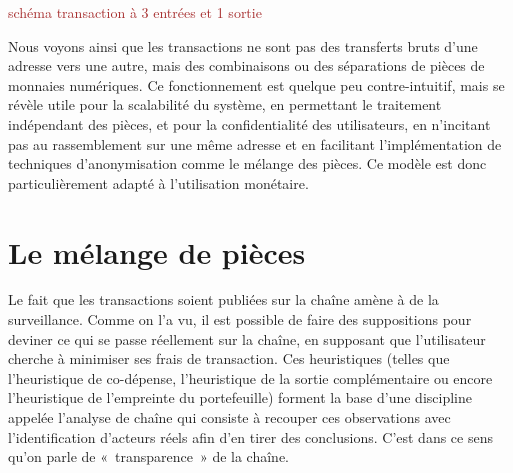 \textcolor{brown}{schéma transaction à 3 entrées et 1 sortie}

Nous voyons ainsi que les transactions ne sont pas des transferts bruts d'une adresse vers une autre, mais des combinaisons ou des séparations de pièces de monnaies numériques. Ce fonctionnement est quelque peu contre-intuitif, mais se révèle utile pour la scalabilité du système, en permettant le traitement indépendant des pièces, et pour la confidentialité des utilisateurs, en n'incitant pas au rassemblement sur une même adresse et en facilitant l'implémentation de techniques d'anonymisation comme le mélange des pièces. Ce modèle est donc particulièrement adapté à l'utilisation monétaire.

%
%

\section*{Le mélange de pièces}

Le fait que les transactions soient publiées sur la chaîne amène à de la surveillance. Comme on l'a vu, il est possible de faire des suppositions pour deviner ce qui se passe réellement sur la chaîne, en supposant que l'utilisateur cherche à minimiser ses frais de transaction. Ces heuristiques (telles que l'heuristique de co-dépense, l'heuristique de la sortie complémentaire ou encore l'heuristique de l'empreinte du portefeuille) forment la base d'une discipline appelée l'analyse de chaîne qui consiste à recouper ces observations avec l'identification d'acteurs réels afin d'en tirer des conclusions. C'est dans ce sens qu'on parle de «~transparence~» de la chaîne. %

